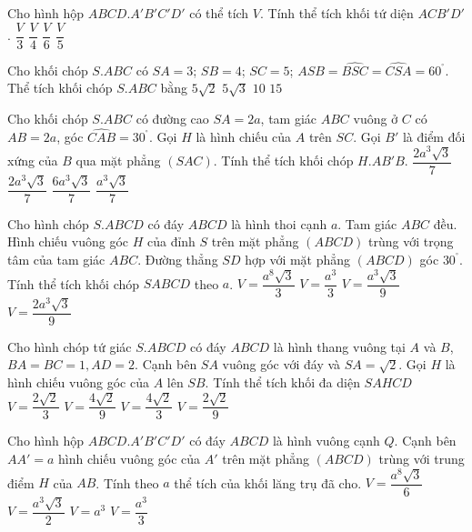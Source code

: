 \begin{ex}%
	Cho hình hộp $ABCD.A'B'C'D'$ có thể tích $V$. Tính thể tích khối tứ diện $ACB'D'$.
	\choice
	{\True $\dfrac{V}{3}$}
	{$\dfrac{V}{4}$}
	{$\dfrac{V}{6}$}
	{$\dfrac{V}{5}$}
\end{ex}

\begin{ex}%
	Cho khối chóp $S.ABC$ có $SA=3$; $SB=4$; $SC=5$; $\widehat{ASB}=\widehat{BSC}=\widehat{CSA}=60^{^{\circ}}$. Thể tích khối chóp $S.ABC$ bằng 
	\choice
	{\True $5\sqrt{2}$}
	{$5\sqrt{3}$}
	{$10$}
	{$15$}
\end{ex}

\begin{ex}%
	Cho khối chóp $S.ABC$ có đường cao $SA=2a$, tam giác $ABC$ vuông ở $C$ có $AB=2a$, góc $\widehat{CAB}=30^{^{\circ}}$. Gọi $H$ là hình chiếu của $A$ trên $SC$. Gọi $B'$ là điểm đối xứng của $B$ qua mặt phẳng $(SAC)$. Tính thể tích khối chóp $H.AB'B$. 
	\choice
	{\True $\dfrac{2a^3\sqrt{3}}{7}$}
	{$\dfrac{2a^3\sqrt{3}}{7}$}
	{$\dfrac{6a^3\sqrt{3}}{7}$}
	{$\dfrac{a^3\sqrt{3}}{7}$}
\end{ex}

\begin{ex}%
	Cho hình chóp $S.ABCD$ có đáy $ABCD$ là hình thoi cạnh $a$. Tam giác $ABC$ đều. Hình chiếu vuông góc $H$ của đỉnh $S$ trên mặt phẳng $(ABCD)$ trùng với trọng tâm của tam giác $ABC$. Đường thẳng $SD$ hợp với mặt phẳng $(ABCD)$ góc $30^{^{\circ}}$. Tính thể tích khối chóp $SABCD$ theo $a$. 
	\choice
	{$V=\dfrac{a^8\sqrt{3}}{3}$}
	{$V=\dfrac{a^3}{3}$}
	{\True $V=\dfrac{a^3\sqrt{3}}{9}$}
	{$V=\dfrac{2a^3\sqrt{3}}{9}$}
\end{ex}

\begin{ex}%
	Cho hình chóp tứ giác $S.ABCD$ có đáy $ABCD$ là hình thang vuông tại $A$ và $B$, $BA=BC=1,AD=2$. Cạnh bên $SA$ vuông góc với đáy và $SA=\sqrt{2}$. Gọi $H$ là hình chiếu vuông góc của $A$ lên $SB$. Tính thể tích khối đa diện $SAHCD$ 
	\choice
	{$V=\dfrac{2\sqrt{2}}{3}$}
	{\True $V=\dfrac{4\sqrt{2}}{9}$}
	{$V=\dfrac{4\sqrt{2}}{3}$}
	{$V=\dfrac{2\sqrt{2}}{9}$}
\end{ex}

\begin{ex}%
	Cho hình hộp $ABCD.A'B'C'D'$ có đáy $ABCD$ là hình vuông cạnh $Q$. Cạnh bên $AA'=a$ hình chiếu vuông góc của $A'$ trên mặt phẳng $(ABCD)$ trùng với trung điểm $H$ của $AB$. Tính theo $a$ thể tích của khối lăng trụ đã cho. 
	\choice
	{$V=\dfrac{a^8\sqrt{3}}{6}$}
	{\True $V=\dfrac{a^3\sqrt{3}}{2}$}
	{$V=a^3$}
	{$V=\dfrac{a^3}{3}$}
\end{ex}

